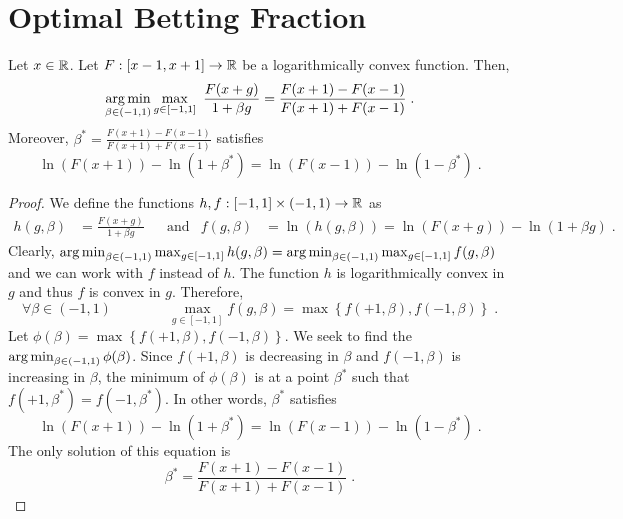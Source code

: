 \section{Optimal Betting Fraction}
\label{section:optimal-betting-fraction}

\begin{theorem}
\label{theorem:optimal-betting-fraction}
Let $x \in \mathbb{R}$. Let $F:[x-1,x+1] \to \mathbb{R}$ be a logarithmically convex function. Then,
\[
\operatorname*{arg\,min}_{\beta \in (-1,1)} \max_{g \in [-1,1]} \ \frac{F(x+g)}{1 + \beta g}
= \frac{F(x+1) - F(x-1)}{F(x+1) + F(x-1)} \; .
\]
Moreover, $\beta^*=\frac{F(x+1) - F(x-1)}{F(x+1) + F(x-1)}$ satisfies
\[
\ln(F(x+1)) - \ln(1 + \beta^*) =  \ln(F(x-1)) - \ln(1 - \beta^*) \; .
\]
\end{theorem}

\begin{proof}
We define the functions $h,f:[-1,1] \times (-1,1) \to \mathbb{R}$ as
\begin{align*}
h(g, \beta) & = \frac{F(x+g)}{1 + \beta g} &
& \text{and} &
f(g, \beta) & = \ln (h(g,\beta)) = \ln(F(x+g)) - \ln(1 + \beta g) \; .
\end{align*}
Clearly, $\operatorname*{arg\,min}_{\beta \in (-1,1)} \max_{g \in [-1,1]} h(g,\beta) =
\operatorname*{arg\,min}_{\beta \in (-1,1)} \max_{g \in [-1,1]} f(g,\beta)$ and we can work with
$f$ instead of $h$. The function $h$ is logarithmically convex in $g$ and thus
$f$ is convex in $g$. Therefore,
\[
\forall \beta \in (-1,1) \qquad \qquad
\max_{g \in [-1,1]} f(g,\beta) = \max \left\{ f(+1,\beta), f(-1,\beta) \right\} \; .
\]
Let $\phi(\beta) = \max \left\{ f(+1,\beta), f(-1,\beta) \right\}$. We seek to
find the $\operatorname*{arg\,min}_{\beta \in (-1,1)} \phi(\beta)$. Since $f(+1,\beta)$ is
decreasing in $\beta$ and $f(-1,\beta)$ is increasing in $\beta$, the minimum
of $\phi(\beta)$ is at a point $\beta^*$ such that $f(+1,\beta^*) =
f(-1,\beta^*)$.  In other words, $\beta^*$ satisfies
\[
\ln(F(x+1)) - \ln(1 + \beta^*) =  \ln(F(x-1)) - \ln(1 - \beta^*) \; .
\]
The only solution of this equation is
\[
\beta^* = \frac{F(x+1) - F(x-1)}{F(x+1) + F(x-1)} \; .
\]
\end{proof}


